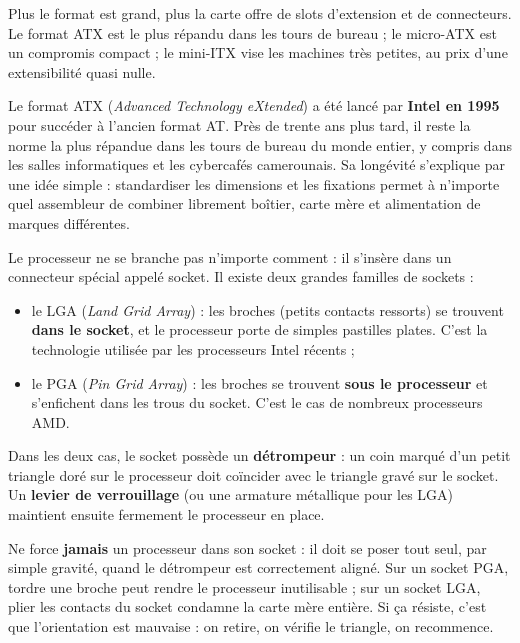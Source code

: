 \documentclass[11pt]{article}
\newcommand{\cle}[1]{{\popxbold\color{popdark}#1}}
\newcounter{popsec}
\newcounter{popsub}
\newcommand{\courssub}[1]{%
  \stepcounter{popsub}%
  \par\vspace{9pt}\noindent{\popxbold\fontsize{11.5}{13}\selectfont\color{popink}{\color{poporange}\thepopsec.\thepopsub}\hspace{6pt}#1}\par\nopagebreak\vspace{4pt}
}
\begin{document}
\begin{aretenir}
Plus le format est grand, plus la carte offre de slots d'extension et de connecteurs. Le format \cle{ATX} est le plus répandu dans les tours de bureau ; le \cle{micro-ATX} est un compromis compact ; le \cle{mini-ITX} vise les machines très petites, au prix d'une extensibilité quasi nulle.
\end{aretenir}

\begin{savaistu}
Le format \cle{ATX} (\emph{Advanced Technology eXtended}) a été lancé par \textbf{Intel en 1995} pour succéder à l'ancien format AT. Près de trente ans plus tard, il reste la norme la plus répandue dans les tours de bureau du monde entier, y compris dans les salles informatiques et les cybercafés camerounais. Sa longévité s'explique par une idée simple : standardiser les dimensions et les fixations permet à n'importe quel assembleur de combiner librement boîtier, carte mère et alimentation de marques différentes.
\end{savaistu}

\courssub{Le socket du processeur}

Le processeur ne se branche pas n'importe comment : il s'insère dans un connecteur spécial appelé \cle{socket}. Il existe deux grandes familles de sockets :

\begin{itemize}
  \item le \cle{LGA} (\emph{Land Grid Array}) : les broches (petits contacts ressorts) se trouvent \textbf{dans le socket}, et le processeur porte de simples pastilles plates. C'est la technologie utilisée par les processeurs Intel récents ;
  \item le \cle{PGA} (\emph{Pin Grid Array}) : les broches se trouvent \textbf{sous le processeur} et s'enfichent dans les trous du socket. C'est le cas de nombreux processeurs AMD.
\end{itemize}

Dans les deux cas, le socket possède un \textbf{détrompeur} : un coin marqué d'un petit triangle doré sur le processeur doit coïncider avec le triangle gravé sur le socket. Un \textbf{levier de verrouillage} (ou une armature métallique pour les LGA) maintient ensuite fermement le processeur en place.

\begin{attention}
Ne force \textbf{jamais} un processeur dans son socket : il doit se poser tout seul, par simple gravité, quand le détrompeur est correctement aligné. Sur un socket PGA, tordre une broche peut rendre le processeur inutilisable ; sur un socket LGA, plier les contacts du socket condamne la carte mère entière. Si ça résiste, c'est que l'orientation est mauvaise : on retire, on vérifie le triangle, on recommence.
\end{attention}
\end{document}
